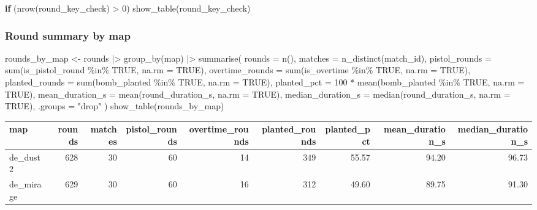 \documentclass[
  letterpaper,
  DIV=11,
  numbers=noendperiod]{scrartcl}
\newenvironment{Shaded}{\begin{snugshade}}{\end{snugshade}}
\newcommand{\AttributeTok}[1]{\textcolor[rgb]{0.40,0.45,0.13}{#1}}
\newcommand{\ConstantTok}[1]{\textcolor[rgb]{0.56,0.35,0.01}{#1}}
\newcommand{\ControlFlowTok}[1]{\textcolor[rgb]{0.00,0.23,0.31}{\textbf{#1}}}
\newcommand{\DecValTok}[1]{\textcolor[rgb]{0.68,0.00,0.00}{#1}}
\newcommand{\FunctionTok}[1]{\textcolor[rgb]{0.28,0.35,0.67}{#1}}
\newcommand{\NormalTok}[1]{\textcolor[rgb]{0.00,0.23,0.31}{#1}}
\newcommand{\OtherTok}[1]{\textcolor[rgb]{0.00,0.23,0.31}{#1}}
\newcommand{\SpecialCharTok}[1]{\textcolor[rgb]{0.37,0.37,0.37}{#1}}
\newcommand{\StringTok}[1]{\textcolor[rgb]{0.13,0.47,0.30}{#1}}
\newcounter{none} %
\begin{document}
\begin{Shaded}
\begin{Highlighting}[]
\ControlFlowTok{if}\NormalTok{ (}\FunctionTok{nrow}\NormalTok{(round\_key\_check) }\SpecialCharTok{\textgreater{}} \DecValTok{0}\NormalTok{) }\FunctionTok{show\_table}\NormalTok{(round\_key\_check)}
\end{Highlighting}
\end{Shaded}

\subsubsection{Round summary by map}\label{round-summary-by-map}

\begin{Shaded}
\begin{Highlighting}[]
\NormalTok{rounds\_by\_map }\OtherTok{\textless{}{-}}\NormalTok{ rounds }\SpecialCharTok{|\textgreater{}}
  \FunctionTok{group\_by}\NormalTok{(map) }\SpecialCharTok{|\textgreater{}}
  \FunctionTok{summarise}\NormalTok{(}
    \AttributeTok{rounds =} \FunctionTok{n}\NormalTok{(),}
    \AttributeTok{matches =} \FunctionTok{n\_distinct}\NormalTok{(match\_id),}
    \AttributeTok{pistol\_rounds =} \FunctionTok{sum}\NormalTok{(is\_pistol\_round }\SpecialCharTok{\%in\%} \ConstantTok{TRUE}\NormalTok{, }\AttributeTok{na.rm =} \ConstantTok{TRUE}\NormalTok{),}
    \AttributeTok{overtime\_rounds =} \FunctionTok{sum}\NormalTok{(is\_overtime }\SpecialCharTok{\%in\%} \ConstantTok{TRUE}\NormalTok{, }\AttributeTok{na.rm =} \ConstantTok{TRUE}\NormalTok{),}
    \AttributeTok{planted\_rounds =} \FunctionTok{sum}\NormalTok{(bomb\_planted }\SpecialCharTok{\%in\%} \ConstantTok{TRUE}\NormalTok{, }\AttributeTok{na.rm =} \ConstantTok{TRUE}\NormalTok{),}
    \AttributeTok{planted\_pct =} \DecValTok{100} \SpecialCharTok{*} \FunctionTok{mean}\NormalTok{(bomb\_planted }\SpecialCharTok{\%in\%} \ConstantTok{TRUE}\NormalTok{, }\AttributeTok{na.rm =} \ConstantTok{TRUE}\NormalTok{),}
    \AttributeTok{mean\_duration\_s =} \FunctionTok{mean}\NormalTok{(round\_duration\_s, }\AttributeTok{na.rm =} \ConstantTok{TRUE}\NormalTok{),}
    \AttributeTok{median\_duration\_s =} \FunctionTok{median}\NormalTok{(round\_duration\_s, }\AttributeTok{na.rm =} \ConstantTok{TRUE}\NormalTok{),}
    \AttributeTok{.groups =} \StringTok{"drop"}
\NormalTok{  )}
\FunctionTok{show\_table}\NormalTok{(rounds\_by\_map)}
\end{Highlighting}
\end{Shaded}

{\def\LTcaptype{none} %
\begin{longtable}[]{@{}lrrrrrrrr@{}}
\toprule\noalign{}
map & rounds & matches & pistol\_rounds & overtime\_rounds &
planted\_rounds & planted\_pct & mean\_duration\_s &
median\_duration\_s \\
\midrule\noalign{}
\endhead
\bottomrule\noalign{}
\endlastfoot
de\_dust2 & 628 & 30 & 60 & 14 & 349 & 55.57 & 94.20 & 96.73 \\
de\_mirage & 629 & 30 & 60 & 16 & 312 & 49.60 & 89.75 & 91.30 \\
\end{longtable}
}
\end{document}
